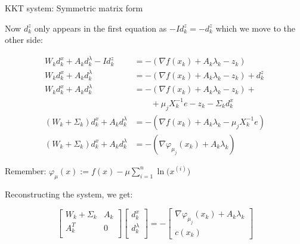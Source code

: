 \documentclass{beamer}
\begin{document}
\begin{frame}{KKT system: Symmetric matrix form}

  Now $d_k^z$ only appears in the first equation as $-I d_k^z = - d_k^z$ which we move to the other side:

  \vspace{-2.0em}
  \begin{align*}
    W_k d_k^x + A_k d_k^\lambda - I d_k^z    & = - (\nabla f(x_k) + A_k \lambda_k - z_k)              \\
    W_k d_k^x + A_k d_k^\lambda              & = - (\nabla f(x_k) + A_k \lambda_k - z_k) + d_k^z      \\
    W_k d_k^x + A_k d_k^\lambda              & = - (\nabla f(x_k) + A_k \lambda_k - z_k) +            \\
                                             & \qquad + \mu_j X_k^{-1} e - z_k - \Sigma_k d_k^x       \\
    (W_k + \Sigma_k) d_k^x + A_k d_k^\lambda & = - (\nabla f(x_k) + A_k \lambda_k - \mu_j X_k^{-1} e) \\
    (W_k + \Sigma_k) d_k^x + A_k d_k^\lambda & = - (\nabla \varphi_{\mu_j}(x_k) + A_k \lambda_k)
  \end{align*}

  \centering
  {\tiny Remember: $\varphi_\mu(x) := f(x) - \mu \sum_{i=1}^n \ln\!\bigl(x^{(i)}\bigr)$}
  \vfill
  \raggedright
  Reconstructing the system, we get:

  \begin{equation}
    \begin{bmatrix}
      W_k + \Sigma_k & A_k \\
      A_k^T          & 0   \\
    \end{bmatrix}
    \begin{bmatrix}
      d_k^x       \\
      d_k^\lambda \\
    \end{bmatrix}
    =
    -
    \begin{bmatrix}
      \nabla \varphi_{\mu_j}(x_k) + A_k \lambda_k \\
      c(x_k)
    \end{bmatrix}
  \end{equation}

\end{frame}
\end{document}
